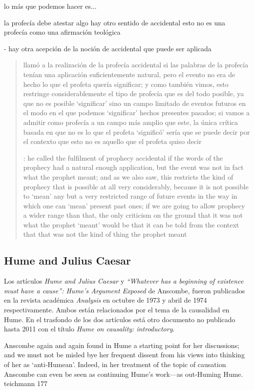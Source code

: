 lo más que podemos hacer es...

la profecía debe atestar algo
hay otro sentido de accidental
esto no es una profecía como una afirmación teológica

- hay otra acepción de la noción de accidental que puede ser aplicada


\blockquote[{\cite[33]{anscombe2008faith:prophandmi}}: he called the fulfilment
of prophecy accidental if the words of the prophecy had a natural enough
application, but the event was not in fact what the prophet meant; and as we
also saw, this restricts the kind of prophecy that is possible at all very
considerably, because it is not possible to `mean' any but a very restricted
range of future events in the way in which one can `mean' present 
past ones; if we are going to allow prophecy a wider range than that, the only
criticism on the ground that it was not what the prophet `meant' would be that
it can be told from the context that that was not the kind of thing the prophet
meant]{llamó a la realización de la profecía accidental si las palabras de la
  profecía tenían una aplicación suficientemente natural, pero el evento no era
  de hecho lo que el profeta quería significar; y como también vimos, esto
  restringe considerablemente el tipo de profecía que es del todo posible, ya
  que no es posible `significar' sino un campo limitado de eventos futuros en el
  modo en el que podemos `significar' hechos presentes  pasados; si
  vamos a admitir como profecía a un campo más amplio que este, la única crítica
  basada en que no es lo que el profeta `significó' sería que se puede decir por
  el contexto que esto no es aquello que el profeta quiso decir}

\subsection{Hume and Julius Caesar}

Los artículos \emph{Hume and Julius Caesar} y \emph{``Whatever has a beginning
  of existence must have a cause'': Hume’s Argument Exposed} de Anscombe, fueron
publicados en la revista académica \emph{Analysis} en octubre de 1973 y abril de
1974 respectivamente. Ambos están relacionados por el tema de la causalidad en
Hume. En el trasfondo de los dos artículos está otro documento no publicado
hasta 2011 con el título \emph{Hume on causality: introductory}.

Anscombe again and again found in Hume a starting point for her discussions; and
we must not be misled bye her frequent dissent from his views into thinking of
her as `anti-Humean'. Indeed, in her treatment of the topic of causation
Anscombe can even be seen as continuing Hume's work---as out-Huming Hume.
teichmann 177


